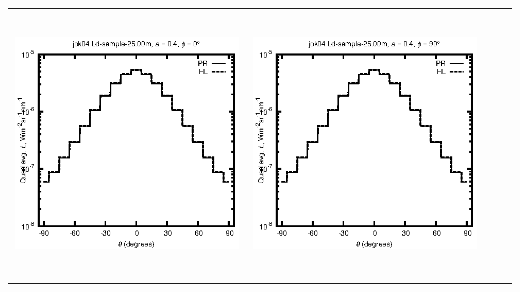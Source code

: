 \begin{tabular}{c c c c}
\includegraphics[height=7cm]{../eps/jok04_Ld_sample_25.00m_fwd.eps} &
\includegraphics[height=7cm]{../eps/jok04_Ld_sample_25.00m_cross.eps} \\
\end{tabular}

\pagebreak

